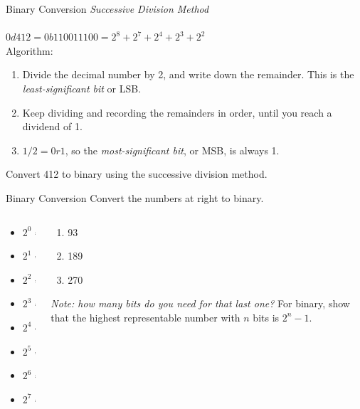 \documentclass{beamer}
\begin{document}
\begin{frame}{Binary Conversion}
\textit{Successive Division Method} \\ \vspace{0.5cm} \hrulefill \\
$0d412 = 0b110011100 = 2^8 + 2^7 + 2^4 + 2^3 + 2^2$ \\
Algorithm:
\begin{enumerate}
\item Divide the decimal number by 2, and write down the remainder.  This is the \textit{least-significant bit} or LSB.
\item Keep dividing and recording the remainders in order, until you reach a dividend of 1.
\item $1/2 = 0 r 1$, so the \textit{most-significant bit}, or MSB, is always 1.
\end{enumerate}
Convert 412 to binary using the successive division method.
\end{frame}

\begin{frame}{Binary Conversion}
Convert the numbers at right to binary. \\ \vspace{1cm}
\begin{columns}[T]
\begin{column}{0.5\textwidth}
\begin{itemize}
\item $2^0 = 1$
\item $2^1 = 2$
\item $2^2 = 4$
\item $2^3 = 8$
\item $2^4 = 16$
\item $2^5 = 32$
\item $2^6 = 64$
\item $2^7 = 128$
\end{itemize}
\end{column}
\begin{column}{0.5\textwidth}
\begin{enumerate}
\item 93
\item 189
\item 270
\end{enumerate}
\textit{Note: how many bits do you need for that last one?}  For binary, show that the highest representable number with $n$ bits is $2^n-1$.
\end{column}
\end{columns}
\end{frame}
\end{document}
